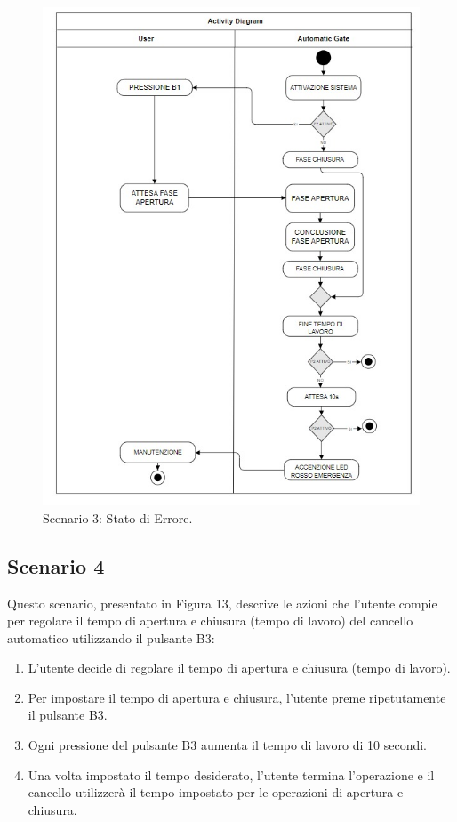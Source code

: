 \documentclass[12pt]{article}
\begin{document}
\begin{figure}[h]
    \centering
    \includegraphics[width = 0.7 \textwidth]{Scenario_3.jpg}
    \caption{Scenario 3: Stato di Errore.}
    
\end{figure}

\newpage
\subsection{Scenario 4}
Questo scenario, presentato in Figura 13, descrive le azioni che l’utente compie per regolare il tempo di apertura e chiusura (tempo di lavoro) del cancello automatico utilizzando il pulsante B3:

\begin{enumerate}
    \item L’utente decide di regolare il tempo di apertura e chiusura (tempo di lavoro).
    \item Per impostare il tempo di apertura e chiusura, l’utente preme ripetutamente il pulsante B3.
    \item Ogni pressione del pulsante B3 aumenta il tempo di lavoro di 10 secondi.
    \item Una volta impostato il tempo desiderato, l’utente termina l’operazione e il cancello utilizzerà il tempo impostato per le operazioni di apertura e chiusura.
\end{enumerate}
\end{document}
